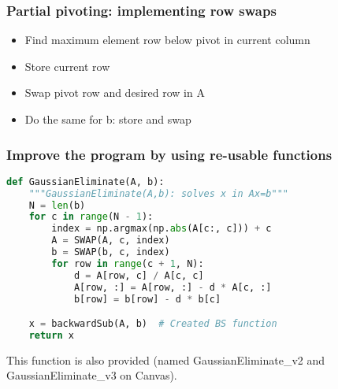 \begin{frame}[fragile]
  \frametitle{Partial pivoting: implementing row swaps}
  \begin{itemize}
    \item<1->  Find maximum element row below pivot in current column
    \item<2->  Store current row
    \item<3-> Swap pivot row and desired row in A
    \item<4-> Do the same for b: store and swap
  \end{itemize}

\end{frame}

\begin{frame}[fragile]
  \frametitle{Improve the program by using re-usable functions}
  \begin{lstlisting}[language=Python]
def GaussianEliminate(A, b):
    """GaussianEliminate(A,b): solves x in Ax=b"""
    N = len(b)
    for c in range(N - 1):
        index = np.argmax(np.abs(A[c:, c])) + c
        A = SWAP(A, c, index)
        b = SWAP(b, c, index)
        for row in range(c + 1, N):
            d = A[row, c] / A[c, c]
            A[row, :] = A[row, :] - d * A[c, :]
            b[row] = b[row] - d * b[c]

    x = backwardSub(A, b)  # Created BS function
    return x
  \end{lstlisting}
  This function is also provided (named GaussianEliminate\_v2 and GaussianEliminate\_v3 on Canvas).
\end{frame}

